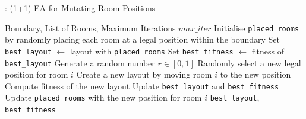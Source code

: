 \documentclass[]{article}
\begin{document}
\begin{algorithm}[H]
    \caption{: (1+1) EA for Mutating Room Positions}
    \label{alg:1+1-ea-position}
    \begin{algorithmic}[1]
        \REQUIRE Boundary, List of Rooms, Maximum Iterations $max\_iter$
        \STATE Initialise \texttt{placed\_rooms} by randomly placing each room at a legal position within the boundary
        \STATE Set \texttt{best\_layout} $\gets$ layout with \texttt{placed\_rooms}
        \STATE Set \texttt{best\_fitness} $\gets$ fitness of \texttt{best\_layout}
        \STATE Generate a random number $r \in [0,1]$
        \STATE Randomly select a new legal position for room $i$
        \STATE Create a new layout by moving room $i$ to the new position
        \STATE Compute fitness of the new layout
        \STATE Update \texttt{best\_layout} and \texttt{best\_fitness}
        \STATE Update \texttt{placed\_rooms} with the new position for room $i$
        \ENDIF
        \ENDIF
        \ENDFOR
        \ENDFOR
        \RETURN \texttt{best\_layout}, \texttt{best\_fitness}
    \end{algorithmic}
\end{algorithm}
\end{document}
